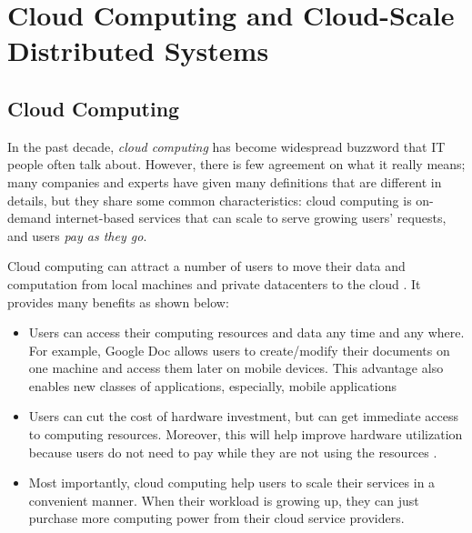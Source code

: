 \section{Cloud Computing and Cloud-Scale Distributed Systems}
\label{bg-cloud}

\subsection{Cloud Computing}

In the past decade, \textit{cloud computing} has become widespread buzzword
that IT people often talk about. However, there is few agreement on what it
really means; many companies and experts have given many definitions
\cite{TwentyoneCloudDef, IBMCloudDef, PCMagCloudDef, Foster+08-CloudAndGrid}
that are different in details, but they share some common characteristics: cloud
computing is on-demand internet-based services that can scale to serve growing
users' requests, and users \textit{pay as they go}.


Cloud computing can attract a number of users to move their data and
computation from local machines and private datacenters to the cloud
\cite{AdobeCloudStat, AWSCustomer, GmailStat, GoogleDriveStat, DropboxStat,
AstroInCloud, FacebookStat, Luo+16-BigDataBioResearch}.
It provides many benefits as shown below:
\begin{itemize}
\item Users can access their computing resources and data any time and any
where. For example, Google Doc allows users to create/modify their documents on
one machine and access them later on mobile devices. This advantage also
enables new classes of applications, especially, mobile applications
\cite{DropboxWebsite, GmailWebsite, GoogleDriveWebsite, iCloudWebsite,
SiriWebsite} 

\item Users can cut the cost of hardware investment, but can get immediate access
to computing resources. Moreover, this will help improve hardware utilization
because users do not need to pay while they are not using the resources
\cite{Marston+11-CloudBusiness}.

\item Most importantly, cloud computing help users to scale their services in a
convenient manner. When their workload is growing up, they can just purchase
more computing power from their cloud service providers.
\end{itemize}

